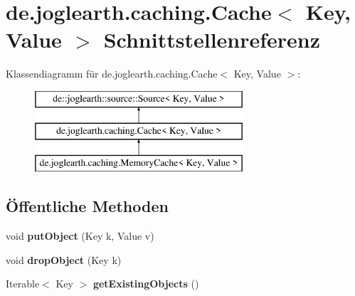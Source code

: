 \section{de.\-joglearth.\-caching.\-Cache$<$ Key, Value $>$ Schnittstellenreferenz}
\label{interfacede_1_1joglearth_1_1caching_1_1_cache_3_01_key_00_01_value_01_4}
Klassendiagramm für de.\-joglearth.\-caching.\-Cache$<$ Key, Value $>$\-:\begin{figure}[H]
\begin{center}
\leavevmode
\includegraphics[height=3.000000cm]{interfacede_1_1joglearth_1_1caching_1_1_cache_3_01_key_00_01_value_01_4}
\end{center}
\end{figure}
\subsection*{Öffentliche Methoden}
\begin{DoxyCompactItemize}
\item 
void {\bfseries put\-Object} (Key k, Value v)\label{interfacede_1_1joglearth_1_1caching_1_1_cache_3_01_key_00_01_value_01_4_a0980f19f862ff7e17ed95a504b2b9607}

\item 
void {\bfseries drop\-Object} (Key k)\label{interfacede_1_1joglearth_1_1caching_1_1_cache_3_01_key_00_01_value_01_4_ac30e620b3eed27411662b0ac177b8eb0}

\item 
Iterable$<$ Key $>$ {\bfseries get\-Existing\-Objects} ()\label{interfacede_1_1joglearth_1_1caching_1_1_cache_3_01_key_00_01_value_01_4_a5dd1ba2f704872ea375db56953eba61d}

\end{DoxyCompactItemize}
